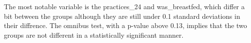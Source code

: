 \documentclass{article}
\begin{document}
The most notable variable is the practices\_24 and was\_breastfed, which differ a bit between the groups although they are still under 0.1 standard deviations in their diffrence. The omnibus test, with a p-value above 0.13, implies that the two groups are not different in a statistically significant manner.



% 
% 















% 
\end{document}
